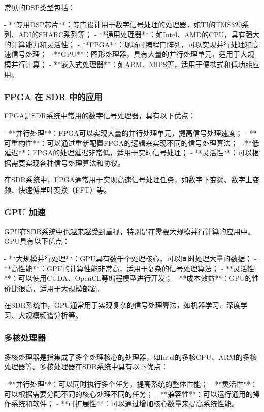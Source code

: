 ﻿\documentclass[UTF8]{ctexbook}
\begin{document}
常见的DSP类型包括：

- **专用DSP芯片**：专门设计用于数字信号处理的处理器，如TI的TMS320系列、ADI的SHARC系列等；
- **通用处理器**：如Intel、AMD的CPU，具有强大的计算能力和灵活性；
- **FPGA**：现场可编程门阵列，可以实现并行处理和高速信号处理；
- **GPU**：图形处理器，具有大量的并行处理单元，适用于大规模并行计算；
- **嵌入式处理器**：如ARM、MIPS等，适用于便携式和低功耗应用。

\subsubsection{FPGA 在 SDR 中的应用}

FPGA是SDR系统中常用的数字信号处理器，具有以下优点：

- **并行处理**：FPGA可以实现大量的并行处理单元，提高信号处理速度；
- **可重构性**：可以通过重新配置FPGA的逻辑来实现不同的信号处理算法；
- **低延迟**：FPGA的处理延迟非常低，适用于实时信号处理；
- **灵活性**：可以根据需要实现各种信号处理算法和协议。

在SDR系统中，FPGA通常用于实现高速信号处理任务，如数字下变频、数字上变频、快速傅里叶变换（FFT）等。

\subsubsection{GPU 加速}

GPU在SDR系统中也越来越受到重视，特别是在需要大规模并行计算的应用中。GPU具有以下优点：

- **大规模并行处理**：GPU具有数千个处理核心，可以同时处理大量的数据；
- **高性能**：GPU的计算性能非常高，适用于复杂的信号处理算法；
- **灵活性**：可以使用CUDA、OpenCL等编程模型进行开发；
- **成本效益**：GPU的性价比很高，适用于大规模部署。

在SDR系统中，GPU通常用于实现复杂的信号处理算法，如机器学习、深度学习、大规模频谱分析等。

\subsubsection{多核处理器}

多核处理器是指集成了多个处理核心的处理器，如Intel的多核CPU、ARM的多核处理器等。多核处理器在SDR系统中具有以下优点：

- **并行处理**：可以同时执行多个任务，提高系统的整体性能；
- **灵活性**：可以根据需要分配不同的核心处理不同的任务；
- **兼容性**：可以运行通用的操作系统和软件；
- **可扩展性**：可以通过增加核心数量来提高系统性能。
\end{document}
